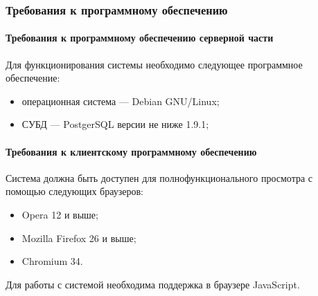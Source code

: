 \subsubsection{Требования к программному обеспечению}
\label{sec:provision_requirements:software}


\paragraph{Требования к программному обеспечению серверной части}
Для функционирования системы необходимо следующее программное обеспечение:
\begin{itemize}
\item операционная система --– Debian GNU/Linux;
\item СУБД –-- PostgerSQL версии не ниже 1.9.1;
\end{itemize}

\paragraph{Требования к клиентскому программному обеспечению}
Система должна быть доступен для полнофункционального просмотра с помощью следующих браузеров:
\begin{itemize}
\item Opera 12 и выше;
\item Mozilla Firefox 26 и выше;
\item Chromium 34.
\end{itemize}
Для работы с системой необходима поддержка в браузере JavaScript.
